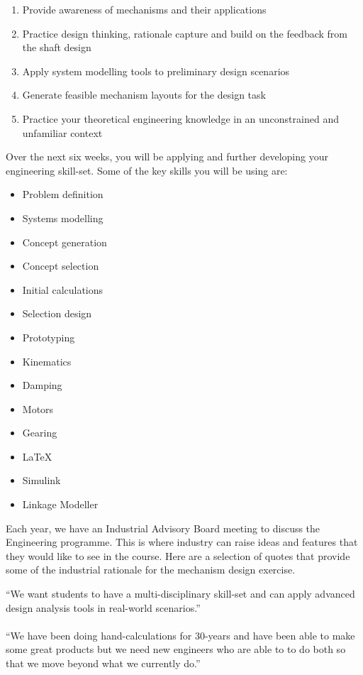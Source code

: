 \begin{enumerate}
  \item Provide awareness of mechanisms and their applications
  \item Practice design thinking, rationale capture and build on the feedback from the shaft design
  \item Apply system modelling tools to preliminary design scenarios
  \item Generate feasible mechanism layouts for the design task
  \item Practice your theoretical engineering knowledge in an unconstrained and unfamiliar context
\end{enumerate}

 Over the next six weeks, you will be applying and further developing your engineering skill-set. Some of the key skills you will be using are:

\begin{multicols}{2}
\begin{itemize}
\item Problem definition
\item Systems modelling
\item Concept generation
\item Concept selection
\item Initial calculations
\item Selection design
\item Prototyping
\item Kinematics
\item Damping
\item Motors
\item Gearing
\item \LaTeX
\item Simulink
\item Linkage Modeller
\end{itemize}
\end{multicols}

Each year, we have an Industrial Advisory Board meeting to discuss the Engineering programme. This is where industry can raise ideas and features that they would like to see in the course. Here are a selection of quotes that provide some of the industrial rationale for the mechanism design exercise.


\begin{center}
``We want students to have a multi-disciplinary skill-set and can apply advanced design analysis tools in real-world scenarios.'' \\~\\
``We have been doing hand-calculations for 30-years and have been able to make some great products but we need new engineers who are able to to do both so that we move beyond what we currently do.''
\end{center}

